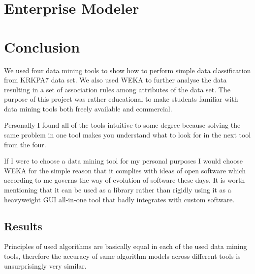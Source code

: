 \documentclass[11pt]{article}
\begin{document}
\section{Enterprise Modeler}



\clearpage

\section{Conclusion}
We used four data mining tools to show how to perform simple data
classification from KRKPA7 data set. We also used WEKA to further analyse the
data resulting in a set of association rules among attributes of the data set.
The purpose of this project was rather educational to make students familiar
with data mining tools both freely available and commercial.

Personally I found all of the tools intuitive to some degree because solving
the same problem in one tool makes you understand what to look for in the next
tool from the four.

If I were to choose a data mining tool for my personal purposes I would choose
WEKA for the simple reason that it complies with ideas of open software which
according to me governs the way of evolution of software these days. It is
worth mentioning that it can be used as a library rather than rigidly using it
as a heavyweight GUI all-in-one tool that badly integrates with custom
software.

\subsection{Results}
Principles of used algorithms are basically equal in each of the used data
mining tools, therefore the accuracy of same algorithm models across different
tools is unsurprisingly very similar.



\end{document}
